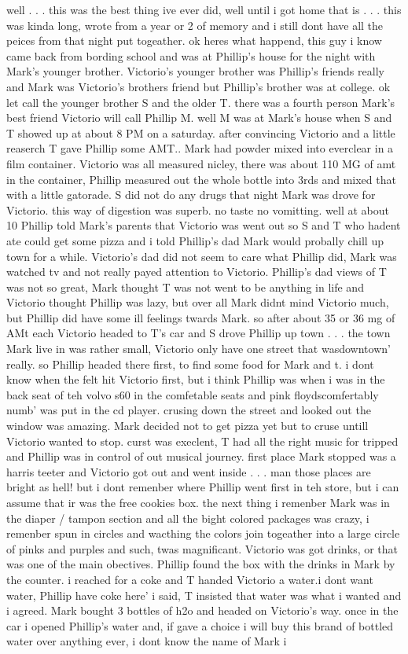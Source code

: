 \documentclass[12pt]{book}
\begin{document}
well . . .  this was the best thing ive ever did, well until i got home that is . . .  this was kinda long, wrote from a year or 2 of memory and i still dont have all the peices from that night put togeather. ok heres what happend, this guy i know came back from bording school and was at Phillip's house for the night with Mark's younger brother. Victorio's younger brother was Phillip's friends really and Mark was Victorio's brothers friend but Phillip's brother was at college. ok let call the younger brother S and the older T. there was a fourth person Mark's best friend Victorio will call Phillip M. well M was at Mark's house when S and T showed up at about 8 PM on a saturday. after convincing Victorio and a little reaserch T gave Phillip some AMT.. Mark had powder mixed into everclear in a film container. Victorio was all measured nicley, there was about 110 MG of amt in the container, Phillip measured out the whole bottle into 3rds and mixed that with a little gatorade. S did not do any drugs that night Mark was drove for Victorio. this way of digestion was superb. no taste no vomitting. well at about 10 Phillip told Mark's parents that Victorio was went out so S and T who hadent ate could get some pizza and i told Phillip's dad Mark would probally chill up town for a while. Victorio's dad did not seem to care what Phillip did, Mark was watched tv and not really payed attention to Victorio. Phillip's dad views of T was not so great, Mark thought T was not went to be anything in life and Victorio thought Phillip was lazy, but over all Mark didnt mind Victorio much, but Phillip did have some ill feelings twards Mark. so after about 35 or 36 mg of AMt each Victorio headed to T's car and S drove Phillip up town . . .  the town Mark live in was rather small, Victorio only have one street that wasdowntown' really. so Phillip headed there first, to find some food for Mark and t. i dont know when the felt hit Victorio first, but i think Phillip was when i was in the back seat of teh volvo s60 in the comfetable seats and pink floydscomfertably numb' was put in the cd player. crusing down the street and looked out the window was amazing. Mark decided not to get pizza yet but to cruse untill Victorio wanted to stop. curst was execlent, T had all the right music for tripped and Phillip was in control of out musical journey. first place Mark stopped was a harris teeter and Victorio got out and went inside . . .  man those places are bright as hell! but i dont remenber where Phillip went first in teh store, but i can assume that ir was the free cookies box. the next thing i remenber Mark was in the diaper / tampon section and all the bight colored packages was crazy, i remenber spun in circles and wacthing the colors join togeather into a large circle of pinks and purples and such, twas magnificant. Victorio was got drinks, or that was one of the main obectives. Phillip found the box with the drinks in Mark by the counter. i reached for a coke and T handed Victorio a water.i dont want water, Phillip have coke here' i said, T insisted that water was what i wanted and i agreed. Mark bought 3 bottles of h2o and headed on Victorio's way. once in the car i opened Phillip's water and, if gave a choice i will buy this brand of bottled water over anything ever, i dont know the name of Mark i 
\end{document}
